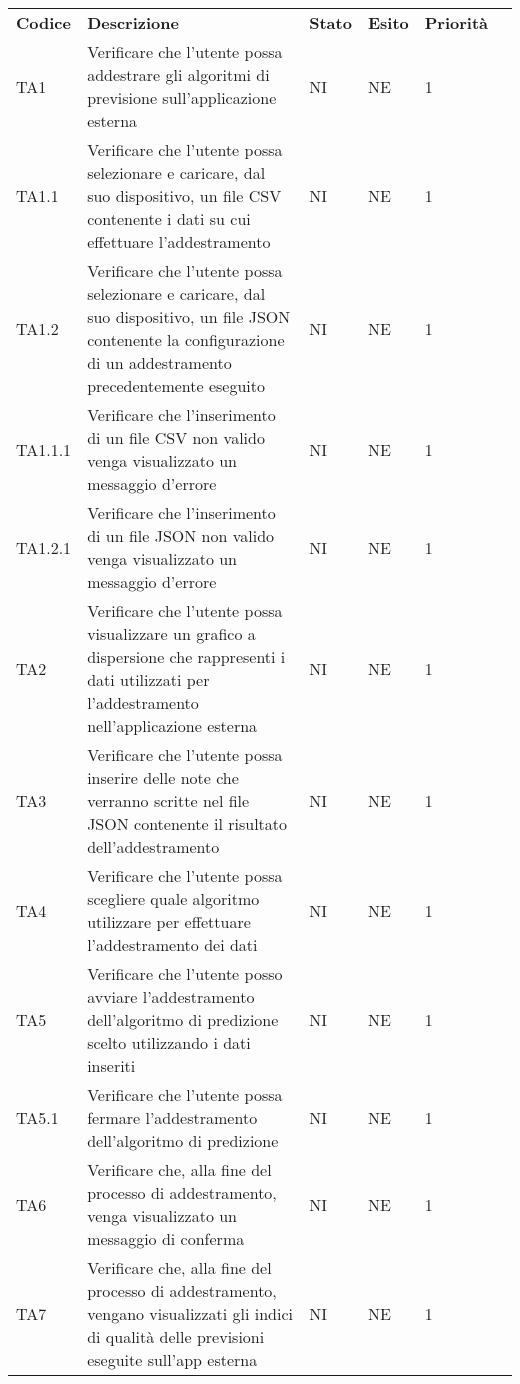 \setcounter{table}{0}
\begin{longtable} {
	>{}p{12mm}
	>{}p{79.5mm}
	>{}p{9mm}
	>{}p{8mm}
	>{}p{14mm}
	>{}p{0mm}}
	\rowcolor{gray!50}
	\textbf{Codice} & \textbf{Descrizione} & \textbf{Stato} & \textbf{Esito} & \textbf{Priorità} & \TBstrut \\
	TA1 & Verificare che l'utente possa addestrare gli algoritmi di previsione sull'applicazione esterna & NI & NE & 1 & \TBstrut \\ [2mm]
	TA1.1 & Verificare che l'utente possa selezionare e caricare, dal suo dispositivo, un file CSV contenente i dati su cui effettuare l'addestramento & NI & NE & 1 & \TBstrut \\ [2mm]
	TA1.2 & Verificare che l'utente possa selezionare e caricare, dal suo dispositivo, un file JSON contenente la configurazione di un addestramento precedentemente eseguito & NI & NE & 1 & \TBstrut \\ [2mm]
	TA1.1.1 & Verificare che l'inserimento di un file CSV non valido venga visualizzato un messaggio d'errore & NI & NE & 1 & \TBstrut \\ [2mm]
	TA1.2.1 & Verificare che l'inserimento di un file JSON non valido venga visualizzato un messaggio d'errore & NI & NE & 1 & \TBstrut \\ [2mm]
	TA2 & Verificare che l'utente possa visualizzare un grafico a dispersione che rappresenti i dati utilizzati per l'addestramento nell'applicazione esterna & NI & NE & 1 & \TBstrut \\ [2mm]
	TA3 & Verificare che l'utente possa inserire delle note che verranno scritte nel file JSON contenente il risultato dell'addestramento & NI & NE& 1 & \TBstrut \\ [2mm]
	TA4 & Verificare che l'utente possa scegliere quale algoritmo utilizzare per effettuare l'addestramento dei dati & NI & NE & 1 & \TBstrut \\ [2mm]
	TA5 & Verificare che l'utente posso avviare l'addestramento dell'algoritmo di predizione scelto utilizzando i dati inseriti & NI & NE & 1 & \TBstrut \\ [2mm]
	TA5.1 & Verificare che l'utente possa fermare l'addestramento dell'algoritmo di predizione & NI & NE & 1 & \TBstrut \\ [2mm]
	TA6 & Verificare che, alla fine del processo di addestramento, venga visualizzato un messaggio di conferma & NI & NE & 1 & \TBstrut \\ [2mm]
	TA7 & Verificare che, alla fine del processo di addestramento, vengano visualizzati gli indici di qualità delle previsioni eseguite sull'app esterna & NI & NE & 1 & \TBstrut \\ [2mm]

\end{longtable}
